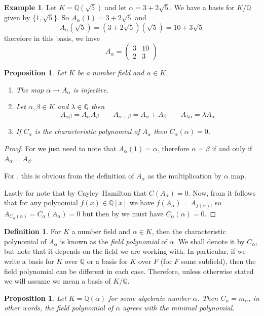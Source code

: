 \documentclass[11pt,a4paper]{report}
\theoremstyle{plain}
\newtheorem{prop}[subsection]{Proposition}
\theoremstyle{definition}
\newtheorem{defn}[subsection]{Definition}
\newtheorem{exmp}[subsection]{Example}
\theoremstyle{definition}
\def\QQ{\mathbb{Q}}
\def \a{\alpha}
\def \lam {\lambda}
\newcommand{\matrd}[4]{\begin{pmatrix}#1&#2\\#3&#4\end{pmatrix}}
\begin{document}
	\begin{exmp}
		Let $K=\QQ(\sqrt{5})$ and let $\a=3+2\sqrt{5}$.  We have a basis for $K/\QQ$ given by $\{1,\sqrt{5}\}.$ So $A_\a(1)=3+2\sqrt{5}$ and \[A_\a(\sqrt{5})=(3+2\sqrt{5})(\sqrt{5})=10+3\sqrt{5}\] therefore in this basis, we have \[A_\a=\matrd{3}{10}{2}{3}\]
	\end{exmp}
	
	\begin{prop}Let $K$ be a number field and $\a \in K$.
		\begin{enumerate}
			\item[\Snowman] The map $\a \to A_\a$ is injective.
			\item[\Tribar] Let $\a,\beta \in K$ and $\lam \in \QQ$ then \[A_{\a \beta}=A_{\a}A_{\beta} \qquad A_{\a+\beta}=A_\a+ A_\beta \qquad A_{\lam \a}=\lam A_\a\]
			\item[\Fire] If $C_\a$ is the characteristic polynomial of $A_\a$ then $C_\a(\a)=0$.
		\end{enumerate}
	\end{prop}
	
	\begin{proof}
		For \Snowman we just need to note that $A_\a(1)=\a$, therefore $\a=\beta$ if and only if $A_\a=A_\beta$.
		
		For \Tribar, this is obvious from the definition of $A_\a$ as the multiplication by $\a$ map.
		
		Lastly for \Fire note that by Cayley--Hamilton that $C(A_\a)=0$. Now, from \Tribar it follows that for any polynomial $f(x) \in \QQ[x]$ we have $f(A_\a)=A_{f(\a)}$, so $A_{C_\a(\a)}=C_\a(A_\a)=0$ but then by \Snowman we must have $C_\a(\a)=0$. 
		
	\end{proof}
	
	\begin{defn}
		For $K$ a number field and $\a \in K$, then the characteristic polynomial of $A_\a$ is known as the \textit{field polynomial} of $\a$. We shall denote it by $C_\a$, but note that it depends on the field we are working with. In particular, if we write a basis for $K$ over $\QQ$ or a basis for $K$ over $F$ (for $F$ some subfield), then the field polynomial can be different in each case. Therefore, unless otherwise stated we will assume we mean a basis of $K/\QQ$.
	\end{defn}
	
	\begin{prop}\label{prop: field pol min pol}
		Let $K=\QQ(\a)$ for some algebraic number $\a$. Then $C_\a=m_\a$, in other words, the field polynomial of $\a$ agrees with the minimal polynomial.
	\end{prop}
	
\end{document}

